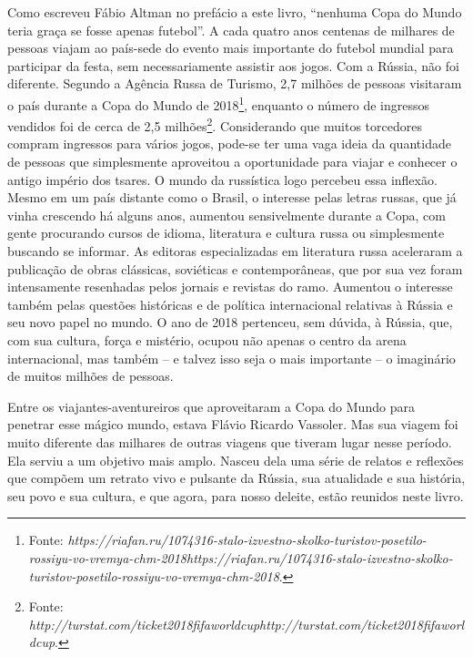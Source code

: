 Como escreveu Fábio Altman no prefácio a este livro, ``nenhuma Copa do
Mundo teria graça se fosse apenas futebol''. A cada quatro anos centenas
de milhares de pessoas viajam ao país-sede do evento mais importante do
futebol mundial para participar da festa, sem necessariamente assistir
aos jogos. Com a Rússia, não foi diferente. Segundo a Agência Russa de
Turismo, 2,7 milhões de pessoas visitaram o país durante a Copa do Mundo
de 2018\footnote{Fonte:
  \emph{https://riafan.ru/1074316-stalo-izvestno-skolko-turistov-posetilo-rossiyu-vo-vremya-chm-2018}{\emph{https://riafan.ru/1074316-stalo-izvestno-skolko-turistov-posetilo-rossiyu-vo-vremya-chm-2018}}.},
enquanto o número de ingressos vendidos foi de cerca de 2,5
milhões\footnote{Fonte:
  \emph{http://turstat.com/ticket2018fifaworldcup}{\emph{http://turstat.com/ticket2018fifaworldcup}}.}.
Considerando que muitos torcedores compram ingressos para vários jogos,
pode-se ter uma vaga ideia da quantidade de pessoas que simplesmente
aproveitou a oportunidade para viajar e conhecer o antigo império dos
tsares. O mundo da russística logo percebeu essa inflexão. Mesmo em um
país distante como o Brasil, o interesse pelas letras russas, que já
vinha crescendo há alguns anos, aumentou sensivelmente durante a Copa,
com gente procurando cursos de idioma, literatura e cultura russa ou
simplesmente buscando se informar. As editoras especializadas em
literatura russa aceleraram a publicação de obras clássicas, soviéticas
e contemporâneas, que por sua vez foram intensamente resenhadas pelos
jornais e revistas do ramo. Aumentou o interesse também pelas questões
históricas e de política internacional relativas à Rússia e seu novo
papel no mundo. O ano de 2018 pertenceu, sem dúvida, à Rússia, que, com
sua cultura, força e mistério, ocupou não apenas o centro da arena
internacional, mas também -- e talvez isso seja o mais importante -- o
imaginário de muitos milhões de pessoas.

Entre os viajantes-aventureiros que aproveitaram a Copa do Mundo para
penetrar esse mágico mundo, estava Flávio Ricardo Vassoler. Mas sua
viagem foi muito diferente das milhares de outras viagens que tiveram
lugar nesse período. Ela serviu a um objetivo mais amplo. Nasceu dela
uma série de relatos e reflexões que compõem um retrato vivo e pulsante
da Rússia, sua atualidade e sua história, seu povo e sua cultura, e que
agora, para nosso deleite, estão reunidos neste livro.

